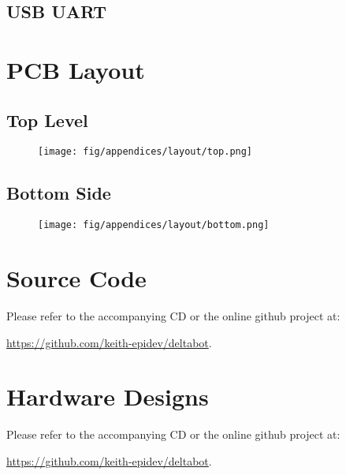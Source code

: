 \documentclass[a4paper, 11pt, twoside]{Thesis}  %
\begin{document}
{\section{USB UART}
\begin{figure}[htbp]
\centering
{}
\end{figure}
\clearpage

\chapter{PCB Layout}
\label{AppendixD}

\section{Top Level}
\begin{figure}[H]
\centering%
\texttt{[image: fig/appendices/layout/top.png]}
\label{fig:top.png}
\end{figure}
\section{Bottom Side}
\begin{figure}[H]
\centering%
\texttt{[image: fig/appendices/layout/bottom.png]}
\label{fig:bottom.png}
\end{figure}\chapter{Source Code}
\label{AppendixE}

Please refer to the accompanying CD or the online github project at:

\href{https://github.com/keith-epidev/deltabot}{https://github.com/keith-epidev/deltabot}.
\chapter{Hardware Designs}
\label{AppendixF}

Please refer to the accompanying CD or the online github project at:

\href{https://github.com/keith-epidev/deltabot}{https://github.com/keith-epidev/deltabot}.




}
\backmatter

\label{Bibliography}
\end{document}
